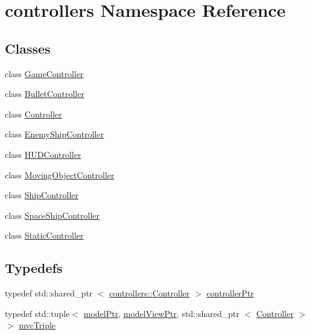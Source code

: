 \hypertarget{namespacecontrollers}{\section{controllers \-Namespace \-Reference}
\label{de/d2c/namespacecontrollers}
}
\subsection*{\-Classes}
\begin{DoxyCompactItemize}
\item 
class \hyperlink{classcontrollers_1_1GameController}{\-Game\-Controller}
\item 
class \hyperlink{classcontrollers_1_1BulletController}{\-Bullet\-Controller}
\item 
class \hyperlink{classcontrollers_1_1Controller}{\-Controller}
\item 
class \hyperlink{classcontrollers_1_1EnemyShipController}{\-Enemy\-Ship\-Controller}
\item 
class \hyperlink{classcontrollers_1_1HUDController}{\-H\-U\-D\-Controller}
\item 
class \hyperlink{classcontrollers_1_1MovingObjectController}{\-Moving\-Object\-Controller}
\item 
class \hyperlink{classcontrollers_1_1ShipController}{\-Ship\-Controller}
\item 
class \hyperlink{classcontrollers_1_1SpaceShipController}{\-Space\-Ship\-Controller}
\item 
class \hyperlink{classcontrollers_1_1StaticController}{\-Static\-Controller}
\end{DoxyCompactItemize}
\subsection*{\-Typedefs}
\begin{DoxyCompactItemize}
\item 
typedef std\-::shared\-\_\-ptr\*
$<$ \hyperlink{classcontrollers_1_1Controller}{controllers\-::\-Controller} $>$ \hyperlink{namespacecontrollers_ab74cf2ed38c0b0460698b4eb6fe8bec5}{controller\-Ptr}
\item 
typedef std\-::tuple$<$ \hyperlink{ModelView_8h_a78966ddb517fca8d2b29a2bc5c31e74e}{model\-Ptr}, \*
\hyperlink{Controller_8h_a8ca0a41a38eb52be242997413482c0cf}{model\-View\-Ptr}, std\-::shared\-\_\-ptr\*
$<$ \hyperlink{classcontrollers_1_1Controller}{\-Controller} $>$ $>$ \hyperlink{namespacecontrollers_afa9121480272f6c66b98dfad7aa403d3}{mvc\-Triple}
\end{DoxyCompactItemize}
